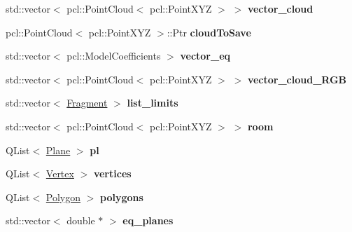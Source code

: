 \begin{DoxyCompactItemize}
\mbox{\label{classMainWindow_a008546b8cbf367b6e97e366c4589d1a5}} 
std\+::vector$<$ pcl\+::\+Point\+Cloud$<$ pcl\+::\+Point\+X\+YZ $>$ $>$ {\bfseries vector\+\_\+cloud}
\item 
\mbox{\label{classMainWindow_a44d3e7e6098cddb397e1ca26e1c94960}} 
pcl\+::\+Point\+Cloud$<$ pcl\+::\+Point\+X\+YZ $>$\+::Ptr {\bfseries cloud\+To\+Save}
\item 
\mbox{\label{classMainWindow_a6ee83b2d6702a0a004a47db770120b76}} 
std\+::vector$<$ pcl\+::\+Model\+Coefficients $>$ {\bfseries vector\+\_\+eq}
\item 
\mbox{\label{classMainWindow_a7854ffa4bd34848d15406b033933f2a8}} 
std\+::vector$<$ pcl\+::\+Point\+Cloud$<$ pcl\+::\+Point\+X\+YZ $>$ $>$ {\bfseries vector\+\_\+cloud\+\_\+\+R\+GB}
\item 
\mbox{\label{classMainWindow_a3ba800b63dde403575263a10efb0422e}} 
std\+::vector$<$ \hyperlink{classFragment}{Fragment} $>$ {\bfseries list\+\_\+limits}
\item 
\mbox{\label{classMainWindow_ac09ffc325d981294d43ce5a2f31d3038}} 
std\+::vector$<$ pcl\+::\+Point\+Cloud$<$ pcl\+::\+Point\+X\+YZ $>$ $>$ {\bfseries room}
\item 
\mbox{\label{classMainWindow_ae66cd602d3e6e6ca34f278534be99087}} 
Q\+List$<$ \hyperlink{classPlane}{Plane} $>$ {\bfseries pl}
\item 
\mbox{\label{classMainWindow_a73fe7472d7ac9fc69cf261e2c44e9453}} 
Q\+List$<$ \hyperlink{classVertex}{Vertex} $>$ {\bfseries vertices}
\item 
\mbox{\label{classMainWindow_ad492b5bd41c228fadc6fed5404b1fd32}} 
Q\+List$<$ \hyperlink{classPolygon}{Polygon} $>$ {\bfseries polygons}
\item 
\mbox{\label{classMainWindow_a43b36978f24818ddb3337f66e8905892}} 
std\+::vector$<$ double $\ast$ $>$ {\bfseries eq\+\_\+planes}
\item 
\mbox{\label{classMainWindow_abc4bbbdd16bd42a6be673c86e881b6e2}} 

\end{DoxyCompactItemize}
